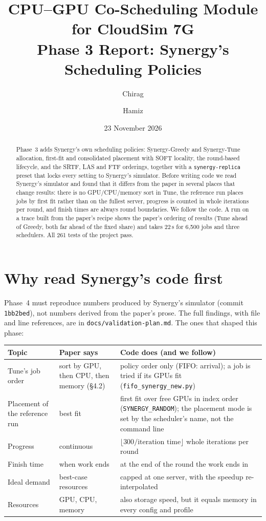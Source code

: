 \documentclass[11pt,a4paper]{article}
\title{CPU--GPU Co-Scheduling Module for CloudSim 7G\\[4pt]
\large Phase 3 Report: Synergy's Scheduling Policies}
\author{Chirag \and Hamiz}
\date{23 November 2026}
\newcommand{\code}[1]{\texttt{#1}}
\begin{document}
\maketitle

\begin{abstract}
Phase~3 adds Synergy's own scheduling policies: Synergy-Greedy and Synergy-Tune allocation, first-fit
and consolidated placement with SOFT locality, the round-based lifecycle, and the SRTF, LAS and FTF
orderings, together with a \code{synergy-replica} preset that locks every setting to Synergy's simulator.
Before writing code we read Synergy's simulator and found that it differs from the paper in several
places that change results: there is no GPU/CPU/memory sort in Tune, the reference run places jobs by
first fit rather than on the fullest server, progress is counted in whole iterations per round, and
finish times are always round boundaries. We follow the code. A run on a trace built from the paper's
recipe shows the paper's ordering of results (Tune ahead of Greedy, both far ahead of the fixed share)
and takes 22\,s for 6{,}500 jobs and three schedulers. All 261 tests of the project pass.
\end{abstract}

\tableofcontents

\section{Why read Synergy's code first}

Phase~4 must reproduce numbers produced by Synergy's simulator (commit \code{1bb2bed}), not numbers
derived from the paper's prose. The full findings, with file and line references, are in
\code{docs/validation-plan.md}. The ones that shaped this phase:

\begin{center}
\begin{tabularx}{\linewidth}{@{}lXX@{}}
\toprule
Topic & Paper says & Code does (and we follow) \\
\midrule
Tune's job order & sort by GPU, then CPU, then memory (\S4.2) & policy order only (FIFO: arrival); a job is
  tried if its GPUs fit (\code{fifo\_synergy\_new.py}) \\
Placement of the reference run & best fit & first fit over free GPUs in index order
  (\code{SYNERGY\_RANDOM}); the placement mode is set by the scheduler's name, not the command line \\
Progress & continuous & \(\lfloor 300 / \text{iteration time} \rfloor\) whole iterations per round \\
Finish time & when work ends & at the end of the round the work ends in \\
Ideal demand & best-case resources & capped at one server, with the speedup re-interpolated \\
Resources & GPU, CPU, memory & also storage speed, but it equals memory in every config and profile \\
\bottomrule
\end{tabularx}
\end{center}
\end{document}
